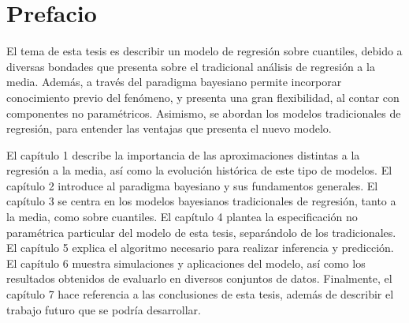 \pagestyle{plain}
\chapter*{Prefacio}


El tema de esta tesis es describir un modelo de regresi\'on sobre cuantiles, debido a diversas bondades que presenta sobre el tradicional an\'alisis de regresi\'on a la media. Adem\'as, a través del paradigma bayesiano permite incorporar conocimiento previo del fen\'omeno, y presenta una gran flexibilidad, al contar con componentes no param\'etricos. Asimismo, se abordan los modelos tradicionales de regresi\'on, para entender las ventajas que presenta el nuevo modelo.

El cap\'itulo 1 describe la importancia de las aproximaciones distintas a la regresi\'on a la media, así como la evoluci\'on hist\'orica de este tipo de modelos. El cap\'itulo 2 introduce al paradigma bayesiano y sus fundamentos generales. El cap\'itulo 3 se centra en los modelos bayesianos tradicionales de regresi\'on, tanto a la media, como sobre cuantiles. El cap\'itulo 4 plantea la especificaci\'on no param\'etrica particular del modelo de esta tesis, separ\'andolo de los tradicionales. El cap\'itulo 5 explica el algoritmo necesario para realizar inferencia y predicci\'on. El cap\'itulo 6 muestra simulaciones y aplicaciones del modelo, as\'i como los resultados obtenidos de evaluarlo en diversos conjuntos de datos. Finalmente, el cap\'itulo 7 hace referencia a las conclusiones de esta tesis, adem\'as de describir el trabajo futuro que se podr\'ia desarrollar.